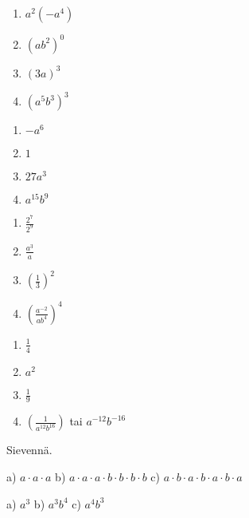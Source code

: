         
    \begin{tehtava}%
        \begin{enumerate}
        	\item $a^2(-a^4) $ 
        	\item $(ab^2)^0$ 
        	\item $(3a)^3$ 
        	\item $(a^5b^3)^3$
		\end{enumerate}        
        \begin{vastaus}
        \begin{enumerate}
            \item $-a^6$ 
            \item $1$ 
            \item $27a^3$ 
            \item $a^{15}b^9$
        \end{enumerate}
        \end{vastaus}
    \end{tehtava} 
    
    \begin{tehtava}%
        \begin{enumerate}
        	\item $\frac{2^7}{2^9}$ 
        	\item $\frac{a^3}{a}$ 
        	\item $\left(\frac{1}{3}\right)^2$ 
        	\item $\left(\frac{a^{-2}}{ab^4}\right)^4$
		\end{enumerate}        
        \begin{vastaus}
        \begin{enumerate}
            \item $\frac{1}{4}$ 
            \item $a^2$ 
            \item $\frac{1}{9} $ 
            \item $ \left(\frac{1}{a^{12}b^{16}}\right)$ tai $a^{-12}b^{-16}$
        \end{enumerate}
        \end{vastaus}
    \end{tehtava}     
            
        
        
        
    
    Sievennä.
    \begin{tehtava}
        a) $a\cdot a\cdot a$ \quad
        b) $a\cdot a\cdot a\cdot b\cdot b\cdot b\cdot b$ \quad
        c) $a\cdot b\cdot a\cdot b\cdot a\cdot b\cdot a$
        
        \begin{vastaus}
            a) $a^3$ \qquad
            b) $a^3b^4$ \qquad
            c) $a^4b^3$
        \end{vastaus}
    \end{tehtava}
    
